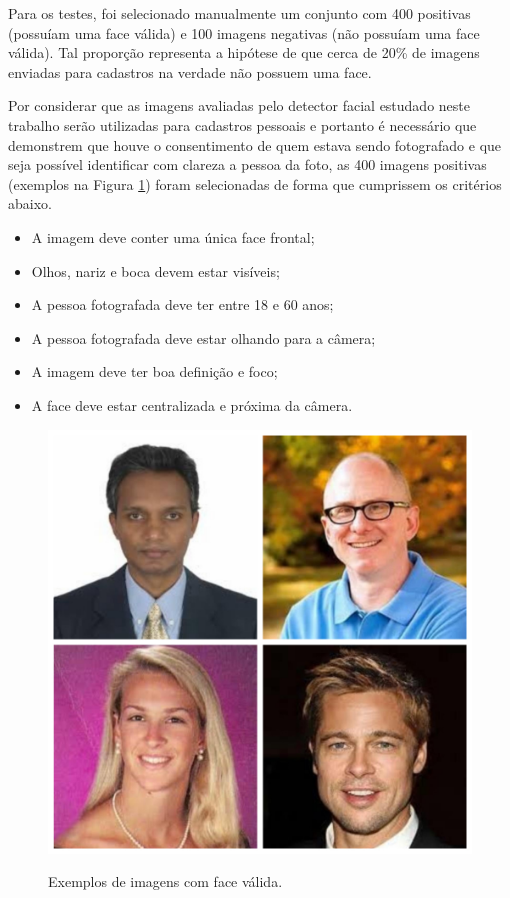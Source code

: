 Para os testes, foi selecionado manualmente um conjunto com 400 positivas (possuíam uma face válida) e 100 imagens negativas (não possuíam uma face válida). Tal proporção representa a hipótese de que cerca de 20\% de imagens enviadas para cadastros na verdade não possuem uma face.

Por considerar que as imagens avaliadas pelo detector facial estudado neste trabalho serão utilizadas para cadastros pessoais e portanto é necessário que demonstrem que houve o consentimento de quem estava sendo fotografado e que seja possível identificar com clareza a pessoa da foto, as 400 imagens positivas (exemplos na Figura \ref{fig:valid-faces}) foram selecionadas de forma que cumprissem os critérios abaixo.

\begin{itemize}
    \item A imagem deve conter uma única face frontal;
    \item Olhos, nariz e boca devem estar visíveis;
    \item A pessoa fotografada deve ter entre 18 e 60 anos;
    \item A pessoa fotografada deve estar olhando para a câmera;
    \item A imagem deve ter boa definição e foco;
    \item A face deve estar centralizada e próxima da câmera.
\end{itemize}

\begin{figure}[htb]
    \centering
    \caption{Exemplos de imagens com face válida.}
    \includegraphics[scale=.25]{figs/valid_faces.jpg}
    \label{fig:valid-faces}
\end{figure}

